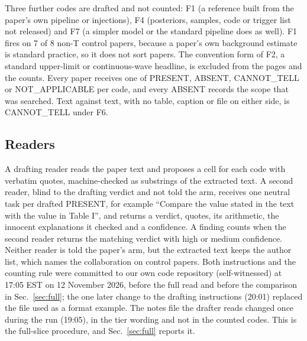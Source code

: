 \documentclass[reprint,amsmath,amssymb,aps,superscriptaddress,nofootinbib]{revtex4-2}
\begin{document}
Three further codes are drafted and not counted: F1 (a reference built from the paper's own pipeline or injections), F4 (posteriors, samples, code or trigger list not released) and F7 (a simpler model or the standard pipeline does as well). F1 fires on 7 of 8 non-T control papers, because a paper's own background estimate is standard practice, so it does not sort papers. The convention form of F2, a standard upper-limit or continuous-wave headline, is excluded from the pages and the counts. Every paper receives one of PRESENT, ABSENT, CANNOT\_TELL or NOT\_APPLICABLE per code, and every ABSENT records the scope that was searched. Text against text, with no table, caption or file on either side, is CANNOT\_TELL under F6.

\subsection{Readers}

A drafting reader reads the paper text and proposes a cell for each code with verbatim quotes, machine-checked as substrings of the extracted text. A second reader, blind to the drafting verdict and not told the arm, receives one neutral task per drafted PRESENT, for example ``Compare the value stated in the text with the value in Table I'', and returns a verdict, quotes, its arithmetic, the innocent explanations it checked and a confidence. A finding counts when the second reader returns the matching verdict with high or medium confidence. Neither reader is told the paper's arm, but the extracted text keeps the author list, which names the collaboration on control papers. Both instructions and the counting rule were committed to our own code repository (self-witnessed) at 17:05 EST on 12 November 2026, before the full read and before the comparison in Sec.~\ref{sec:full}; the one later change to the drafting instructions (20:01) replaced the file used as a format example. The notes file the drafter reads changed once during the run (19:05), in the tier wording and not in the counted codes. This is the full-slice procedure, and Sec.~\ref{sec:full} reports it.
\end{document}
